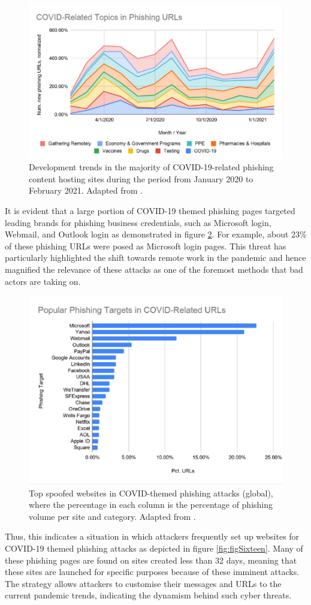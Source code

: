 \captionsetup{font= footnotesize}
\begin{figure}[H]
    \centering
    \includegraphics[width=0.5\linewidth]{background/CovidPhising.png}
    \caption{Development trends in the majority of COVID-19-related phishing content hosting sites during the period from January 2020 to February 2021. Adapted from \cite{Unit42AtricleCovidPhishing2021}.}
    \label{fig:figFourteen}
\end{figure}

It is evident that a large portion of COVID-19 themed phishing pages targeted leading brands for phishing business credentials, such as Microsoft login, Webmail, and Outlook login as demonstrated in figure \ref{fig:figFiveteen}. For example, about 23\% of these phishing URLs were posed as Microsoft login pages. This threat has particularly highlighted the shift towards remote work in the pandemic and hence magnified the relevance of these attacks as one of the foremost methods that bad actors are taking on.


\captionsetup{font= footnotesize}
\begin{figure}[H]
    \centering
    \includegraphics[width=0.5\linewidth]{background/TOPCOVIDURLS.png}
    \caption{Top spoofed websites in COVID-themed phishing attacks (global), where the percentage in each column is the percentage of phishing volume per site and category. Adapted from \cite{Unit42AtricleCovidPhishing2021}.}
    \label{fig:figFiveteen}
\end{figure}

Thus, this indicates a situation in which attackers frequently set up websites for COVID-19 themed phishing attacks as depicted in figure \ref{fig:figSixteen}. Many of these phishing pages are found on sites created less than 32 days, meaning that these sites are launched for specific purposes because of these imminent attacks. The strategy allows attackers to customise their messages and URLs to the current pandemic trends, indicating the dynamism behind such cyber threats.

